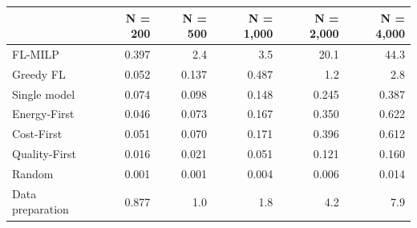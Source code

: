\begin{tabular}{lrrrrr}
\toprule
 & N = 200 & N = 500 & N = 1,000 & N = 2,000 & N = 4,000 \\
\midrule
FL-MILP & 0.397 & 2.4 & 3.5 & 20.1 & 44.3 \\
Greedy FL & 0.052 & 0.137 & 0.487 & 1.2 & 2.8 \\
Single model & 0.074 & 0.098 & 0.148 & 0.245 & 0.387 \\
Energy-First & 0.046 & 0.073 & 0.167 & 0.350 & 0.622 \\
Cost-First & 0.051 & 0.070 & 0.171 & 0.396 & 0.612 \\
Quality-First & 0.016 & 0.021 & 0.051 & 0.121 & 0.160 \\
Random & 0.001 & 0.001 & 0.004 & 0.006 & 0.014 \\
Data preparation & 0.877 & 1.0 & 1.8 & 4.2 & 7.9 \\
\bottomrule
\end{tabular}
